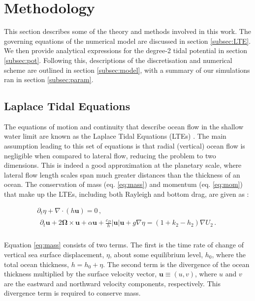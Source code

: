 \section{Methodology}\label{sec:method}

This section describes some of the theory and methods involved in this work. The governing equations of the numerical model are discussed in section \ref{subsec:LTE}. We then provide analytical expressions for the degree-2 tidal potential in section \ref{subsec:pot}. Following this, descriptions of the discretisation and numerical scheme are outlined in section \ref{subsec:model}, with a summary of our simulations ran in section \ref{subsec:param}.

\subsection{Laplace Tidal Equations \label{subsec:LTE}}

The equations of motion and continuity that describe ocean flow in the shallow water limit are known as the Laplace Tidal Equations (LTEs) \citep{lamb1932hydrodynamics}. The main assumption leading to this set of equations is that radial (vertical) ocean flow is negligible when compared to lateral flow, reducing the problem to two dimensions. This is indeed a good approximation at the planetary scale, where lateral flow length scales span much greater distances than the thickness of an ocean. The conservation of mass (eq. \ref{eq:mass}) and momentum (eq. \ref{eq:mom}) that make up the LTEs, including both Rayleigh and bottom drag, are given as \citep{sears1995tidal,tyler2008strong,matsuyama2014tidal}:


\vspace{-0.5cm}
\begin{gather}
\partial_t \eta + \nabla \cdot \left(h \bm{u}\right) = 0\, , \label{eq:mass}\\
\begin{aligned} 
\partial_t \bm{u} + 2 \bm{\Omega} \times \bm{u} + \alpha\bm{u} + \frac{c_D}{h} \left|\bm{u}\right| \bm{u}  + g \nabla \eta = (1 + k_2 - h_2) \nabla U_2 \, . \label{eq:mom}\\
\end{aligned} 
\end{gather}

Equation \ref{eq:mass} consists of two terms. The first is the time rate of change of vertical sea surface displacement, $\eta$, about some equilibrium level, $h_0$, where the total ocean thickness, $h = h_0 + \eta$. The second term is the divergence of the ocean thickness multiplied by the surface velocity vector, $\bm{u} \equiv (u, v)$, where $u$ and $v$ are the eastward and northward velocity components, respectively. This divergence term is required to conserve mass.


